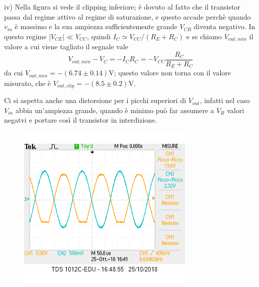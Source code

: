 \documentclass[10pt,a4paper]{article}
\begin{document}
iv) Nella figura si vede il clipping inferiore; è dovuto al fatto che il transistor passa dal regime attivo al regime di saturazione, e questo accade perchè quando $v_{in}$ è massimo e la sua ampiezza sufficientemente grande $ V_{CB}$ diventa negativo.
In questo regime $|V_{CE}|\ll  V_{CC}$, quindi $ I_C \simeq V_{CC}/(R_E+R_C)$ e  se chiamo $V_{out,min}$ il valore a cui viene tagliato il segnale vale \[V_{out,min} -V_C= - I_C R_C = - V_{CC}\frac{R_C}{R_E+R_C}\]
da cui 
$V_{out,min} = -(6.74\pm 0.14) \si{\volt}$; questo valore non torna con il valore misurato, che è $V_{out,clip} = -(8.5\pm 0.2) \si{\volt}$.

Ci si aspetta anche una distorsione per i picchi superiori di $V_{out}$, infatti nel caso   $V_{in}$ abbia un'ampiezza grande, quando è minimo può far assumere a  $V_{B}$ valori negatvi e portare così il transistor in interdizione.


\begin{figure}[h]
	\centering
	\includegraphics[scale=0.5]{clipping.png}
\end{figure}
\end{document}
